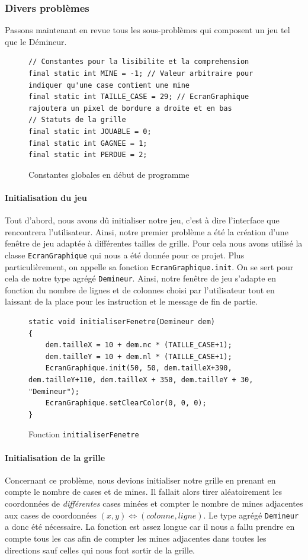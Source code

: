 \documentclass[a4paper, 12pt, oneside]{article}
\newcommand{\var}[1]{\texttt{#1}}
\begin{document}
\subsubsection{Divers problèmes}
Passons maintenant en revue tous les sous-problèmes qui composent un jeu tel que le Démineur.

\begin{figure}[hpt]
	\center
	\caption{\label{fig:constantes} Constantes globales en début de programme}
\begin{lstlisting}
// Constantes pour la lisibilite et la comprehension
final static int MINE = -1; // Valeur arbitraire pour indiquer qu'une case contient une mine
final static int TAILLE_CASE = 29; // EcranGraphique rajoutera un pixel de bordure a droite et en bas
// Statuts de la grille
final static int JOUABLE = 0;
final static int GAGNEE = 1;
final static int PERDUE = 2;
\end{lstlisting}
\end{figure}

\paragraph{Initialisation du jeu} Tout d'abord, nous avons dû initialiser notre jeu, c'est à dire l'interface que rencontrera l'utilisateur. Ainsi, notre premier problème a été la création d'une fenêtre de jeu adaptée à différentes tailles de grille. Pour cela nous avons utilisé la classe \var{EcranGraphique} qui nous a été donnée pour ce projet. Plus particulièrement, on appelle sa fonction \var{EcranGraphique.init}. On se sert pour cela de notre type agrégé \var{Demineur}. Ainsi, notre fenêtre de jeu s'adapte en fonction du nombre de lignes et de colonnes choisi par l'utilisateur tout en laissant de la place pour les instruction et le message de fin de partie.

\begin{figure}[hpt]
	\center
	\caption{\label{fig:fnInitialiserFenetre} Fonction \var{initialiserFenetre}}
\begin{lstlisting}
static void initialiserFenetre(Demineur dem)
{
	dem.tailleX = 10 + dem.nc * (TAILLE_CASE+1);
	dem.tailleY = 10 + dem.nl * (TAILLE_CASE+1);
	EcranGraphique.init(50, 50, dem.tailleX+390, dem.tailleY+110, dem.tailleX + 350, dem.tailleY + 30, "Demineur");
	EcranGraphique.setClearColor(0, 0, 0);
}
\end{lstlisting}
\end{figure} 

\paragraph{Initialisation de la grille} Concernant ce problème, nous devions initialiser notre grille en prenant en compte le nombre de cases et de mines. Il fallait alors tirer aléatoirement les coordonnées de \emph{différentes} cases minées et compter le nombre de mines adjacentes aux cases de coordonnées $(x,y) \iff (colonne, ligne)$. Le type agrégé \var{Demineur} a donc été nécessaire. La fonction est assez longue car il nous a fallu prendre en compte tous les cas afin de compter les mines adjacentes dans toutes les directions sauf celles qui nous font sortir de la grille.
\end{document}
